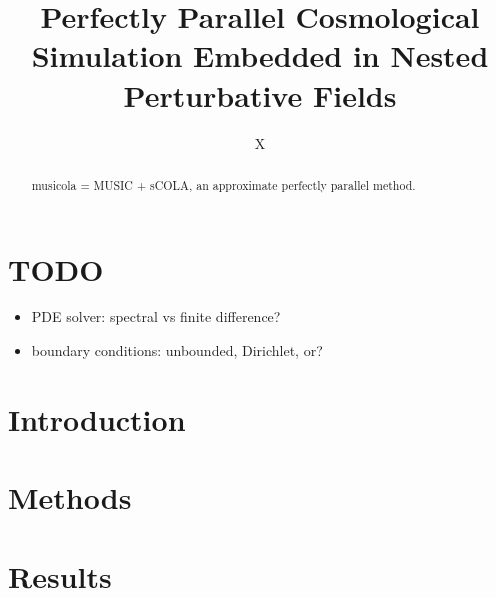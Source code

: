 \documentclass[modern, trackchanges, dvipsnames]{aastex631}
\newcommand{\gkai}[1]{\begin{CJK*}{UTF8}{gkai}\raisebox{.1em}{(}#1\raisebox{.1em}{)}\end{CJK*}}
\begin{document}
\title{\large Perfectly Parallel Cosmological Simulation Embedded in Nested Perturbative Fields
\vspace{0.3em}}


\author[0000-0000-0000-0000]{\normalsize X}
%
%
%







\begin{abstract}

musicola = MUSIC + sCOLA, an approximate perfectly parallel method.

\end{abstract}



\section*{TODO}
\begin{itemize}
\item PDE solver: spectral vs finite difference?
\item boundary conditions: unbounded, Dirichlet, or?
\end{itemize}



\vspace{1em}
\section{Introduction}


\vspace{1em}
\section{Methods}
\label{sec:method}


\vspace{1em}
\section{Results}
\end{document}
